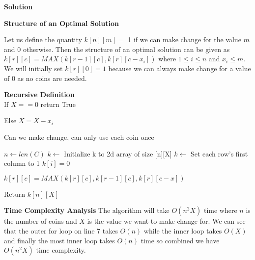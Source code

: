 \documentclass[12pt]{article}
\begin{document}
\begin{enumerate}

\textbf{Solution}

\textbf{Structure of an Optimal Solution}

Let us define the quantity $k[n][m] =$ 1 if we can make change for the value $m$ and 0 otherwise. Then the structure of an optimal solution can be given as $k[r][c] = MAX(k[r-1][c], k[r][c-x_i])$ where $1 \leq i \leq n$ and $x_i \leq m $. We will initially set $k[r][0] = 1$ because we can always make change for a value of 0 as no coins are needed.

\textbf{Recursive Definition}\\
If $ X == 0$ return True

Else
$ X = X - x_i$
 
\begin{algorithm}
\caption{Can we make change, can only use each coin once}
\begin{algorithmic}[1]
 
	\State $n \gets len(C)$
	\State $k \gets$ Initialize k to 2d array of size [n][X]
	\State $k \gets$ Set each row's first column to 1
	 
		\State $k[i] = 0$
	\EndFor
	
					\State $k[r][c] = MAX(k[r][c], k[r-1][c], k[r][c-x])$
				\EndIf
			
			\EndFor
			
		\EndFor
	

		
		
	\EndFor
	
	\State Return $k[n][X]$
\EndProcedure

\end{algorithmic}
\end{algorithm}

\newpage

\textbf{Time Complexity Analysis}
The algorithm will take $O(n^2X)$ time where $n$ is the number of coins and $X$ is the value we want to make change for. We can see that the outer for loop on line 7 takes $O(n)$ while the inner loop takes $O(X)$ and finally the most inner loop takes $O(n)$ time so combined we have $O(n^2X)$ time complexity.



\end{enumerate}
\end{document}
